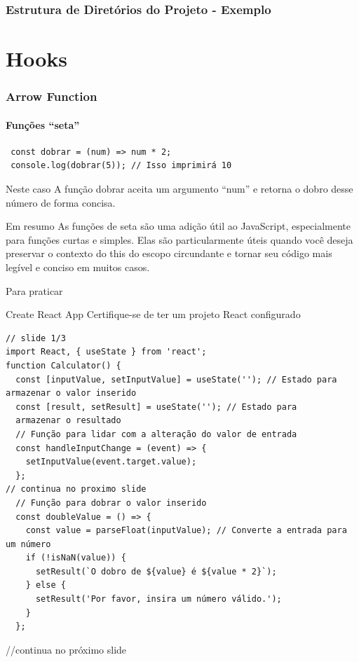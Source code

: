 \documentclass[13pt, xcolor={dvipsnames,svgnames}, portuguese]{beamer}
\begin{document}
\begin{frame}
\frametitle{Estrutura de Diretórios do Projeto - Exemplo}
\end{frame}

\section{Hooks}

\begin{frame}[fragile]
\frametitle{Arrow Function}
\framesubtitle{Funções ``seta''}

\begin{verbatim}
 const dobrar = (num) => num * 2;
 console.log(dobrar(5)); // Isso imprimirá 10
\end{verbatim}
\pause
\begin{exampleblock}{Neste caso}
 A função dobrar aceita um argumento ``num'' e retorna o dobro desse número de forma concisa.
\end{exampleblock}
\pause
\begin{block}{Em resumo}
As funções de seta são uma adição útil ao JavaScript, especialmente para funções curtas e simples. Elas são particularmente úteis quando você deseja preservar o contexto do this do escopo circundante e tornar seu código mais legível e conciso em muitos casos.

\end{block}
\end{frame}
\begin{frame}[fragile]{Para praticar}
\begin{exampleblock}{Create React App}
Certifique-se de ter um projeto React configurado
\end{exampleblock}
\begin{verbatim}
// slide 1/3
import React, { useState } from 'react';
function Calculator() {
  const [inputValue, setInputValue] = useState(''); // Estado para armazenar o valor inserido
  const [result, setResult] = useState(''); // Estado para
  armazenar o resultado
  // Função para lidar com a alteração do valor de entrada
  const handleInputChange = (event) => {
    setInputValue(event.target.value);
  };
// continua no proximo slide
  // Função para dobrar o valor inserido
  const doubleValue = () => {
    const value = parseFloat(inputValue); // Converte a entrada para um número
    if (!isNaN(value)) {
      setResult(`O dobro de ${value} é ${value * 2}`);
    } else {
      setResult('Por favor, insira um número válido.');
    }
  };

\end{verbatim}
//continua no próximo slide
\end{frame}
\end{document}
